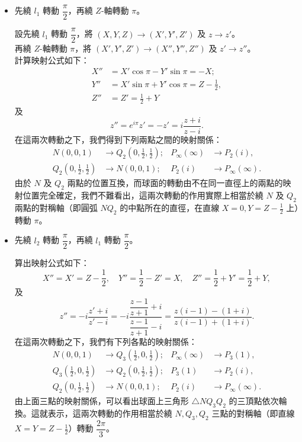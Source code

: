 \begin{example}
\begin{itemize}
  \item[(i)] 先繞 $l_1$ 轉動 $\dfrac{\pi}{2}$，再繞 $Z$-軸轉動 $\pi$。
  \begin{solution}
  設先繞 $l_1$ 轉動 $\dfrac{\pi}{2}$，將 $(X, Y, Z) \longrightarrow (X', Y', Z')$ 及 $z \longrightarrow z'$。 \\
  再繞 $Z$-軸轉動 $\pi$，將 $(X', Y', Z') \longrightarrow (X'', Y'', Z'')$ 及 $z' \longrightarrow z''$。 \\
  計算映射公式如下：
  \begin{align*}
  X'' &= X'\cos\pi - Y'\sin\pi = -X; \\
  Y'' &= X'\sin\pi + Y'\cos\pi = Z-\frac{1}{2}, \\
  Z'' &= Z' = \frac{1}{2}+Y
  \end{align*}
  及
  \[
  z'' = e^{i\pi}z' = -z' = i\frac{z+i}{z-i}.
  \]
  在這兩次轉動之下，我們得到下列兩點之間的映射關係：
  \begin{align*}
  N(0, 0, 1) &\longrightarrow Q_2\left(0, \frac{1}{2}, \frac{1}{2}\right); & P_\infty(\infty) &\longrightarrow P_2(i), \\
  Q_2\left(0, \frac{1}{2}, \frac{1}{2}\right) &\longrightarrow N(0, 0, 1); & P_2(i) &\longrightarrow P_\infty(\infty).
  \end{align*}
  由於 $N$ 及 $Q_2$ 兩點的位置互換，而球面的轉動由不在同一直徑上的兩點的映射位置完全確定，我們不難看出，這兩次轉動的作用實際上相當於繞 $N$ 及 $Q_2$ 兩點的對稱軸（即圓弧 $NQ_2$ 的中點所在的直徑，在直線 $X=0, Y=Z-\frac{1}{2}$ 上）轉動 $\pi$。 \qedhere
  \end{solution}

  \item[(ii)] 先繞 $l_2$ 轉動 $\dfrac{\pi}{2}$，再繞 $l_1$ 轉動 $\dfrac{\pi}{2}$。
  \begin{solution}
  算出映射公式如下：
  \[
  X'' = X' = Z-\frac{1}{2}, \quad Y'' = \frac{1}{2}-Z' = X, \quad Z'' = \frac{1}{2}+Y' = \frac{1}{2}+Y,
  \]
  及
  \[
  z'' = -i\frac{z'+i}{z'-i} = -i\frac{\dfrac{z-1}{z+1}+i}{\dfrac{z-1}{z+1}-i} = \frac{z(i-1)-(1+i)}{z(i-1)+(1+i)}.
  \]
  在這兩次轉動之下，我們有下列各點的映射關係：
  \begin{align*}
  N(0, 0, 1) &\longrightarrow Q_3\left(\frac{1}{2}, 0, \frac{1}{2}\right); & P_\infty(\infty) &\longrightarrow P_3(1), \\
  Q_3\left(\frac{1}{2}, 0, \frac{1}{2}\right) &\longrightarrow Q_2\left(0, \frac{1}{2}, \frac{1}{2}\right); & P_3(1) &\longrightarrow P_2(i), \\
  Q_2\left(0, \frac{1}{2}, \frac{1}{2}\right) &\longrightarrow N(0, 0, 1); & P_2(i) &\longrightarrow P_\infty(\infty).
  \end{align*}
  由上面三點的映射關係，可以看出球面上三角形 $\triangle NQ_3 Q_2$ 的三頂點依次輪換。這就表示，這兩次轉動的作用相當於繞 $N, Q_3, Q_2$ 三點的對稱軸（即直線 $X=Y=Z-\frac{1}{2}$）轉動 $\dfrac{2\pi}{3}$。 \qedhere
  \end{solution}
\end{itemize}
\end{example}

